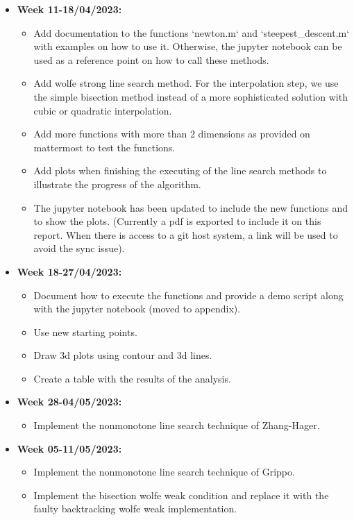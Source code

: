 \documentclass[a4paper,11pt]{article}
\numberwithin{equation}{section} %
\begin{document}
\begin{itemize}
    \item \textbf{Week 11-18/04/2023:}
    \begin{itemize}
        \item Add documentation to the functions `newton.m` and `steepest\_descent.m` with examples on how to use it. Otherwise, the jupyter notebook can be used as a reference point on how to call these methods.
        \item Add wolfe strong line search method. For the interpolation step, we use the simple bisection method instead of a more sophisticated solution with cubic or quadratic interpolation.
        \item Add more functions with more than 2 dimensions as provided on mattermost to test the functions.
        \item Add plots when finishing the executing of the line search methods to illustrate the progress of the algorithm.
        \item The jupyter notebook has been updated to include the new functions and to show the plots. (Currently a pdf is exported to include it on this report. When there is access to a git host system, a link will be used to avoid the sync issue).
    \end{itemize}
    \item \textbf{Week 18-27/04/2023:}
    \begin{itemize}
        \item Document how to execute the functions and provide a demo script along with the jupyter notebook (moved to appendix).
        \item Use new starting points.
        \item Draw 3d plots using contour and 3d lines.
        \item Create a table with the results of the analysis.
    \end{itemize}
    \item \textbf{Week 28-04/05/2023:}
    \begin{itemize}
        \item Implement the nonmonotone line search technique of Zhang-Hager.
    \end{itemize}
    \item \textbf{Week 05-11/05/2023:}
    \begin{itemize}
        \item Implement the nonmonotone line search technique of Grippo.
        \item Implement the bisection wolfe weak condition and replace it with the faulty backtracking wolfe weak implementation.

\end{itemize}
\end{itemize}
\end{document}

